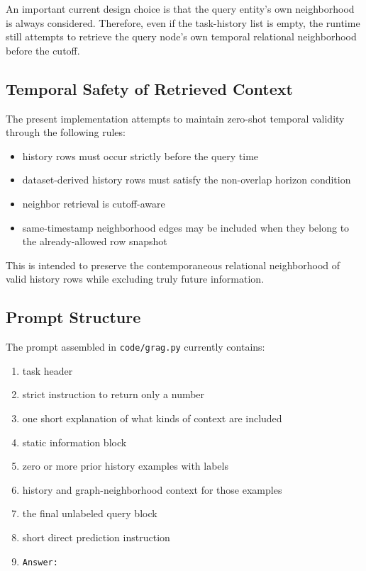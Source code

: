 \documentclass[11pt]{article}
\begin{document}
An important current design choice is that the query entity's own neighborhood is always considered. Therefore, even if the task-history list is empty, the runtime still attempts to retrieve the query node's own temporal relational neighborhood before the cutoff.

\subsection{Temporal Safety of Retrieved Context}

The present implementation attempts to maintain zero-shot temporal validity through the following rules:
\begin{itemize}
\item history rows must occur strictly before the query time
\item dataset-derived history rows must satisfy the non-overlap horizon condition
\item neighbor retrieval is cutoff-aware
\item same-timestamp neighborhood edges may be included when they belong to the already-allowed row snapshot
\end{itemize}

This is intended to preserve the contemporaneous relational neighborhood of valid history rows while excluding truly future information.

\subsection{Prompt Structure}

The prompt assembled in \texttt{code/grag.py} currently contains:
\begin{enumerate}
\item task header
\item strict instruction to return only a number
\item one short explanation of what kinds of context are included
\item static information block
\item zero or more prior history examples with labels
\item history and graph-neighborhood context for those examples
\item the final unlabeled query block
\item short direct prediction instruction
\item \texttt{Answer:}
\end{enumerate}
\end{document}
